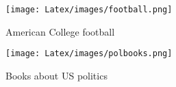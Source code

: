 \begin{figure}[htbp]
\centering
\texttt{[image: Latex/images/football.png]}
\caption{American College football}
\label{fig:football}
\end{figure}

\begin{figure}[htbp]
\centering
\texttt{[image: Latex/images/polbooks.png]}
\caption{Books about US politics}
\label{fig:polbooks}
\end{figure}